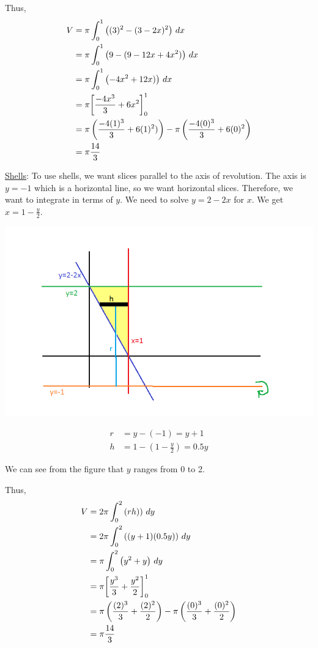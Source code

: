 \documentclass[noinstructornotes]{ximera}
\begin{document}
\begin{problem}
\begin{freeResponse}
Thus, 
\begin{align*}
V &= \pi \int_0^1 \left( (3)^2 - (3 - 2x)^2 \right) \,d x \\
&= \pi \int_0^1 \left( 9 - (9 -12x + 4x^2) \right) \,d x \\
&= \pi \int_0^1 \left(- 4x^2+12x ) \right) \,d x \\
&= \pi \bigg[ \frac{-4x^3}{3}+6x^2 \bigg]_0^1 \\
&= \pi \left(\frac{-4(1)^3}{3}+6(1)^2) \right) - \pi \left(\frac{-4(0)^3}{3}+6(0)^2 \right)\\
&= \pi \frac{14}{3}
\end{align*}

\underline{Shells}:  To use shells, we want slices parallel to the axis of revolution.  The axis is $y=-1$ which is a horizontal line, so we want horizontal slices.  Therefore, we want to integrate in terms of $y$.  We need to solve $y=2-2x$ for $x$.  We get $x=1-\frac{y}{2}$.

\begin{image}
\includegraphics{Figure6-4-12.png}
\end{image}

\begin{align*}
r &= y - (-1) = y+1 \\
h &= 1 - (1-\frac{y}{2}) = 0.5y
\end{align*}

We can see from the figure that $y$ ranges from 0 to 2.

Thus, 
\begin{align*}
V &= 2\pi \int_0^2 \left( rh) \right) \,d y \\
&= 2\pi \int_0^2 \left( (y+1)(0.5y) \right) \,d y \\
&= \pi \int_0^2 \left( y^2 + y \right) \,d y \\
&= \pi \bigg[ \frac{y^3}{3}+\frac{y^2}{2}  \bigg]_0^1 \\
&= \pi \left(\frac{(2)^3}{3}+\frac{(2)^2}{2} \right) - \pi \left(\frac{(0)^3}{3}+\frac{(0)^2}{2} \right)\\
&= \pi \frac{14}{3}
\end{align*}

	\end{freeResponse}

\end{problem}
\end{document}
